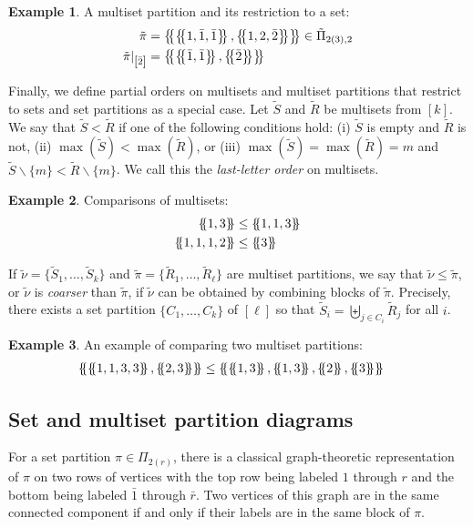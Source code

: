 \documentclass[10pt]{amsart}
\theoremstyle{definition}
\theoremstyle{definition}
\newtheorem{exam}[exam]{Example}
\theoremstyle{plain}
\theoremstyle{remark}
\theoremstyle{plain}
\theoremstyle{plain}
\newcommand{\tpi}{{\tilde{\pi}}}
\newcommand{\tnu}{{\tilde{\nu}}}
\newcommand{\tS}{{\tilde{S}}}
\newcommand{\tR}{{\tilde{R}}}
\newcommand{\multi}[1]{\left\{\mskip-5mu\left\{#1\right\}\mskip-5mu\right\}}
\newcommand{\ov}[1]{\bar{#1}}
\newcommand{\ovb}[1]{\left[\ov{#1}\right]}
\newcommand{\defn}[1]{\textcolor{defncolor}{\emph{#1}}}
\begin{document}
\begin{exam} A multiset partition and its restriction to a set:
    \begin{align*}
        \tpi&=\multi{\multi{1,\ov1,\ov1},\multi{1,2,\ov2}}\in\tilde\Pi_{2(3),2}\\
        \tpi|_{\ovb2}&=\multi{\multi{\ov1,\ov1},\multi{\ov2}}
    \end{align*}
\end{exam}

Finally, we define partial orders on multisets and multiset partitions that restrict to sets and set partitions as a special case. Let $\tS$ and $\tR$ be multisets from $[k]$. We say that $\tS<\tR$ if one of the following conditions hold: (i) $\tS$ is empty and $\tR$ is not, (ii) $\max(\tS)<\max(\tR)$, or (iii) $\max(\tS)=\max(\tR)=m$ and $\tS\smallsetminus\{m\}<\tR\smallsetminus\{m\}$. We call this the \defn{last-letter order} on multisets.

\begin{exam} Comparisons of multisets:
    \begin{align*}
        \multi{1,3}&\leq\multi{1,1,3}\\
        \multi{1,1,1,2}&\leq\multi{3}
    \end{align*}
\end{exam}

If $\tnu=\{\tS_1,\dots,\tS_k\}$ and $\tpi=\{\tR_1,\dots,\tR_\ell\}$ are multiset partitions, we say that $\tnu\leq\tpi$, or $\tnu$ is \defn{coarser} than $\tpi$, if $\tnu$ can be obtained by combining blocks of $\tpi$. Precisely, there exists a set partition $\{C_1,\dots,C_k\}$ of $[\ell]$ so that $\tilde{S}_i=\biguplus_{j\in C_i}\tilde{R}_j$ for all $i$.

\begin{exam} An example of comparing two multiset partitions:
    \begin{align*}
        \multi{\multi{1,1,3,3},\multi{2,3}}&\leq\multi{\multi{1,3},\multi{1,3},\multi{2},\multi{3}}
    \end{align*}
\end{exam}

\subsection[Diagrams]{Set and multiset partition diagrams}

For a set partition $\pi\in\Pi_{2(r)}$, there is a classical graph-theoretic representation of $\pi$ on two rows of vertices with the top row being labeled $1$ through $r$ and the bottom being labeled $\ov1$ through $\ov{r}$. Two vertices of this graph are in the same connected component if and only if their labels are in the same block of $\pi$. 
\end{document}
